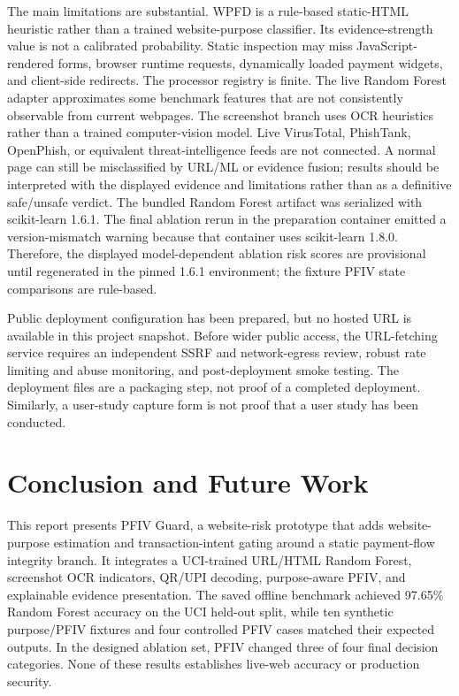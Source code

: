 \documentclass[conference]{IEEEtran}
\begin{document}
The main limitations are substantial. WPFD is a rule-based static-HTML heuristic rather than a trained website-purpose classifier. Its evidence-strength value is not a calibrated probability. Static inspection may miss JavaScript-rendered forms, browser runtime requests, dynamically loaded payment widgets, and client-side redirects. The processor registry is finite. The live Random Forest adapter approximates some benchmark features that are not consistently observable from current webpages. The screenshot branch uses OCR heuristics rather than a trained computer-vision model. Live VirusTotal, PhishTank, OpenPhish, or equivalent threat-intelligence feeds are not connected. A normal page can still be misclassified by URL/ML or evidence fusion; results should be interpreted with the displayed evidence and limitations rather than as a definitive safe/unsafe verdict. The bundled Random Forest artifact was serialized with scikit-learn 1.6.1. The final ablation rerun in the preparation container emitted a version-mismatch warning because that container uses scikit-learn 1.8.0. Therefore, the displayed model-dependent ablation risk scores are provisional until regenerated in the pinned 1.6.1 environment; the fixture PFIV state comparisons are rule-based.

Public deployment configuration has been prepared, but no hosted URL is available in this project snapshot. Before wider public access, the URL-fetching service requires an independent SSRF and network-egress review, robust rate limiting and abuse monitoring, and post-deployment smoke testing. The deployment files are a packaging step, not proof of a completed deployment. Similarly, a user-study capture form is not proof that a user study has been conducted.

\section{Conclusion and Future Work}
This report presents PFIV Guard, a website-risk prototype that adds website-purpose estimation and transaction-intent gating around a static payment-flow integrity branch. It integrates a UCI-trained URL/HTML Random Forest, screenshot OCR indicators, QR/UPI decoding, purpose-aware PFIV, and explainable evidence presentation. The saved offline benchmark achieved 97.65\% Random Forest accuracy on the UCI held-out split, while ten synthetic purpose/PFIV fixtures and four controlled PFIV cases matched their expected outputs. In the designed ablation set, PFIV changed three of four final decision categories. None of these results establishes live-web accuracy or production security.
\end{document}
